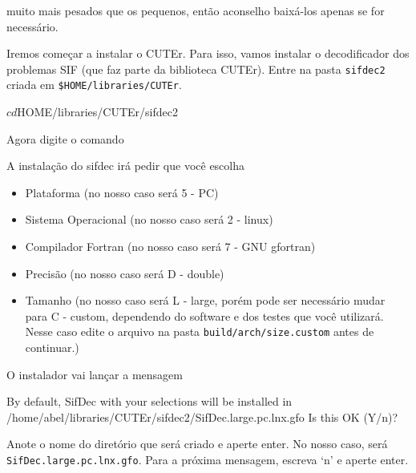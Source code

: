 muito mais pesados que os pequenos, então aconselho baixá-los apenas se for necessário.
Iremos começar a instalar o CUTEr. Para isso, vamos instalar o decodificador
dos problemas SIF (que faz parte da biblioteca CUTEr).
Entre na pasta \verb+sifdec2+ criada em \verb+$HOME/libraries/CUTEr+.
\begin{terminal}
$ cd $HOME/libraries/CUTEr/sifdec2
\end{terminal}
Agora digite o comando
A instalação do sifdec irá pedir que você escolha
\begin{itemize}
 \item Plataforma (no nosso caso será 5 - PC)
 \item Sistema Operacional (no nosso caso será 2 - linux)
 \item Compilador Fortran (no nosso caso será 7 - GNU gfortran)
 \item Precisão (no nosso caso será D - double)
 \item Tamanho (no nosso caso será L - large, porém pode ser necessário mudar para C - custom,
dependendo do software e dos testes que você utilizará. Nesse caso edite o arquivo na pasta
\verb+build/arch/size.custom+ antes de continuar.)
\end{itemize}
O instalador vai lançar a mensagem
\begin{terminal}
 By default, SifDec with your selections will be installed in
  /home/abel/libraries/CUTEr/sifdec2/SifDec.large.pc.lnx.gfo
 Is this OK (Y/n)?
\end{terminal}
Anote o nome do diretório que será criado e aperte enter. No nosso caso, será \\
 \verb+SifDec.large.pc.lnx.gfo+. Para a próxima mensagem, escreva `n' e aperte enter.

